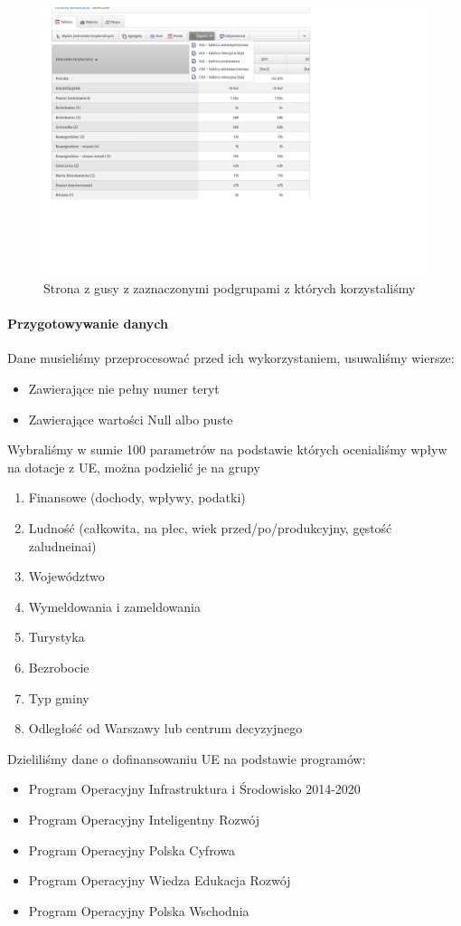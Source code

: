 \documentclass[12pt]{article}
\begin{document}
\begin{figure}[h]
    \caption{Strona z gusy z zaznaczonymi podgrupami z których korzystaliśmy}
    \centering
    \includegraphics[width=1.0\textwidth]{dane5}
\end{figure}

\paragraph{Przygotowywanie danych}
Dane musieliśmy przeprocesować przed ich wykorzystaniem, usuwaliśmy wiersze:
\begin{itemize}
    \item Zawierające nie pełny numer teryt 
    \item Zawierające wartości Null albo puste 
\end{itemize}
Wybraliśmy w sumie 100 parametrów na podstawie których ocenialiśmy wpływ na dotacje z UE, można podzielić je na grupy
\begin{enumerate}
    \item Finansowe (dochody, wpływy, podatki)
    \item Ludność (całkowita, na płec, wiek przed/po/produkcyjny, gęstość zaludneinai)
    \item Województwo 
    \item Wymeldowania i zameldowania 
    \item Turystyka
    \item Bezrobocie
    \item Typ gminy 
    \item Odległość od Warszawy lub centrum decyzyjnego 
\end{enumerate}
Dzieliliśmy dane o dofinansowaniu UE na podstawie programów:
\begin{itemize}
    \item Program Operacyjny Infrastruktura i Środowisko 2014-2020
    \item Program Operacyjny Inteligentny Rozwój
    \item Program Operacyjny Polska Cyfrowa
    \item Program Operacyjny Wiedza Edukacja Rozwój
    \item Program Operacyjny Polska Wschodnia
\end{itemize}
\end{document}
